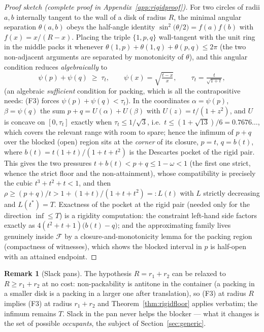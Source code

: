 \documentclass[11pt]{article}
\theoremstyle{definition}
\newtheorem{remark}[theorem]{Remark}
\begin{document}
\begin{proof}[Proof sketch (complete proof in Appendix~\ref{app:rigidproof})]
For two circles of radii $a,b$ internally tangent to the wall of a disk of
radius $R$, the minimal angular separation $\theta(a,b)$ obeys the half-angle
identity $\sin^2\bigl(\theta/2\bigr)=f(a)f(b)$ with $f(x)=x/(R-x)$.
Placing the triple $\{1,p,q\}$ wall-tangent with the unit ring in the middle
packs it whenever $\theta(1,p)+\theta(1,q)+\theta(p,q)\le2\pi$ (the two
non-adjacent arguments are separated by monotonicity of $\theta$), and this
angular condition reduces \emph{algebraically} to
\[
\psi(p)+\psi(q)\;\ge\;\tau_t,\qquad
\psi(x)=\sqrt{\tfrac{t-x}{x}},\qquad \tau_t=\tfrac{t}{\sqrt{1+t}} ,
\]
(an algebraic \emph{sufficient} condition for packing, which is all the
contrapositive needs: (F3) forces $\psi(p)+\psi(q)<\tau_t$). In the
coordinates $\alpha=\psi(p)$, $\beta=\psi(q)$ the sum $p+q=U(\alpha)+U(\beta)$
with $U(z)=t/(1+z^2)$, and $U$ is concave on $[0,\tau_t]$ exactly when
$\tau_t\le1/\sqrt3$, i.e.\ $t\le(1+\sqrt{13})/6=0.7676\dots$, which covers the
relevant range with room to spare; hence the infimum of $p+q$ over the
blocked (open) region sits at the \emph{corner} of its closure, $p=t$,
$q=b(t)$, where $b(t)=t(1+t)/(1+t+t^2)$ is the Descartes pocket of the rigid
pair. This gives the two pressures $t+b(t)<p+q\le1-\omega<1$ (the first one
strict, whence the strict floor and the non-attainment), whose compatibility
is precisely the cubic $t^3+t^2+t<1$, and then
$\rho\ge(p+q)/t>1+(1+t)/(1+t+t^2)=:L(t)$ with $L$ strictly decreasing and
$L(t^{*})=T$. Exactness of the pocket at the rigid pair (needed only for the
direction $\inf\le T$) is a rigidity computation: the constraint left-hand
side factors exactly as $4(t^2+t+1)\bigl(b(t)-q\bigr)$; and the approximating
family lives genuinely inside $\mathcal F$ by a closure-and-monotonicity
lemma for the packing region (compactness of witnesses), which shows the
blocked interval in $p$ is half-open with an attained endpoint.
\end{proof}

\begin{remark}[Slack pans]\label{rem:slack}
The hypothesis $R=r_1+r_2$ can be relaxed to $R\ge r_1+r_2$ at no cost:
non-packability is antitone in the container (a packing in a smaller disk is
a packing in a larger one after translation), so (F3) at radius $R$ implies
(F3) at radius $r_1+r_2$ and Theorem~\ref{thm:rigidfloor} applies verbatim;
the infimum remains $T$. Slack in the pan never helps the blocker --- what it
changes is the set of possible \emph{occupants}, the subject of
Section~\ref{sec:generic}.
\end{remark}
\end{document}
